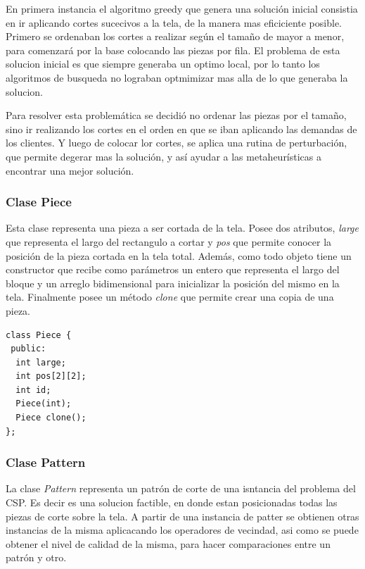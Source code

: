 \documentclass[letterpaper,11pt]{article}
\begin{document}
En primera instancia el algoritmo greedy que genera una soluci\'on inicial consistia en ir aplicando cortes sucecivos a la tela, de la manera mas eficiciente posible. Primero se ordenaban los cortes a realizar seg\'un el tamaño de mayor a menor, para comenzar\'a por la base colocando las piezas por fila. El problema de esta solucion inicial
es que siempre generaba un optimo local, por lo tanto los algoritmos de busqueda no lograban optmimizar mas alla
de lo que generaba la solucion.

Para resolver esta problem\'atica se decidi\'o no ordenar las piezas por el tama\~no, sino ir realizando
los cortes en el orden en que se iban aplicando las demandas de los clientes. Y luego de colocar lor cortes, 
se aplica una rutina de perturbaci\'on, que permite degerar mas la soluci\'on, y as\'i ayudar a las metaheur\'isticas
a encontrar una mejor soluci\'on.

\subsubsection{Clase Piece}

Esta clase representa una pieza a ser cortada de la tela. Posee dos atributos, \emph{large} que representa
el largo del rectangulo a cortar y \emph{pos} que permite conocer la posici\'on de la pieza cortada en la
tela total. Adem\'as, como todo objeto tiene un constructor que recibe como par\'ametros un entero que representa
el largo del bloque y un arreglo bidimensional para inicializar la posici\'on del mismo en la tela.
Finalmente posee un m\'etodo \emph{clone} que permite crear una copia de una pieza.

\begin{verbatim}
class Piece {
 public:
  int large;
  int pos[2][2];
  int id;
  Piece(int);
  Piece clone();
};
\end{verbatim}

\subsubsection{Clase Pattern}

La clase \emph{Pattern} representa un patr\'on de corte de una isntancia del problema del CSP. Es decir es
una solucion factible, en donde estan posicionadas todas las piezas de corte sobre la tela. A partir de una
instancia de patter se obtienen otras instancias de la misma aplicacando los operadores de vecindad, asi como
se puede obtener el nivel de calidad de la misma, para hacer comparaciones entre un patr\'on y otro.\\
\end{document}
